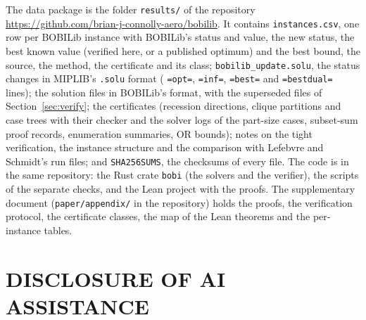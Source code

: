 \documentclass[]{spie}  %
\newcommand{\repourl}{\url{https://github.com/brian-j-connolly-aero/bobilib}}
\theoremstyle{plain}
\newcommand{\code}[1]{\texttt{#1}}
\begin{document}
The data package is the folder \code{results/} of the repository \repourl{}. It contains \code{instances.csv}, one row per BOBILib instance with BOBILib's
status and value, the new status, the best known value (verified here, or a published optimum)
and the best bound, the source, the method, the certificate and its class; \code{bobilib\_update.solu}, the status changes in MIPLIB's
\code{.solu} format (\NumSoluOpt{} \code{=opt=}, \NumSoluInf{} \code{=inf=}, \NumSoluBest{}
\code{=best=} and \NumSoluBestDual{} \code{=bestdual=} lines); the solution files in BOBILib's
format, with the superseded files of Section~\ref{sec:verify}; the certificates (recession
directions, clique partitions and case trees with their checker and the solver logs of the
part-size cases, subset-sum proof records, enumeration summaries, OR bounds); notes on the tight
verification, the instance structure and the comparison with Lefebvre and Schmidt's run files; and
\code{SHA256SUMS}, the checksums of every file. The code is in the same repository: the Rust crate
\code{bobi} (the solvers and the verifier), the scripts of the separate checks, and the Lean
project with the proofs. The supplementary document (\code{paper/appendix/} in the repository)
holds the proofs, the verification protocol, the certificate classes, the map of the Lean theorems
and the per-instance tables.

\section*{DISCLOSURE OF AI ASSISTANCE}
\end{document}
